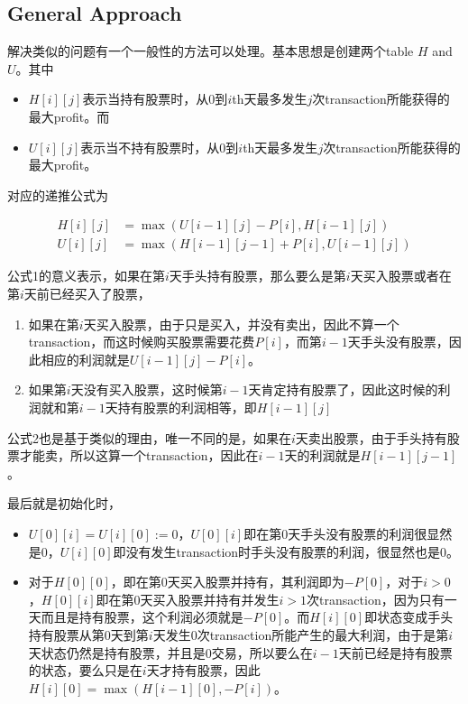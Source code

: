\subsection{General Approach}
\begin{CJK*}{UTF8}{gbsn}
解决类似的问题有一个一般性的方法可以处理。基本思想是创建两个table $H$ and $U$。其中
\begin{itemize}
\item $H[i][j]$表示当持有股票时，从0到$i$th天最多发生$j$次transaction所能获得的最大profit。而
\item $U[i][j]$表示当不持有股票时，从0到$i$th天最多发生$j$次transaction所能获得的最大profit。
\end{itemize}
对应的递推公式为
\end{CJK*}
\begin{align*}
H[i][j] &= \max(U[i-1][j]-P[i], H[i-1][j]) \\
U[i][j] &= \max(H[i-1][j-1] + P[i], U[i-1][j])
\end{align*}
\begin{CJK*}{UTF8}{gbsn}
公式1的意义表示，如果在第$i$天手头持有股票，那么要么是第$i$天买入股票或者在第$i$天前已经买入了股票，
\begin{enumerate}
\item 如果在第$i$天买入股票，由于只是买入，并没有卖出，因此不算一个transaction，而这时候购买股票需要花费$P[i]$，而第$i-1$天手头没有股票，因此相应的利润就是$U[i-1][j] - P[i]$。
\item 如果第$i$天没有买入股票，这时候第$i-1$天肯定持有股票了，因此这时候的利润就和第$i-1$天持有股票的利润相等，即$H[i-1][j]$
\end{enumerate}
公式2也是基于类似的理由，唯一不同的是，如果在$i$天卖出股票，由于手头持有股票才能卖，所以这算一个transaction，因此在$i-1$天的利润就是$H[i-1][j-1]$。
\end{CJK*}
\par
\begin{CJK*}{UTF8}{gbsn}
最后就是初始化时，
\begin{itemize}
\item $U[0][i]=U[i][0]:=0$，$U[0][i]$即在第0天手头没有股票的利润很显然是0，$U[i][0]$即没有发生transaction时手头没有股票的利润，很显然也是0。
\item 对于$H[0][0]$，即在第0天买入股票并持有，其利润即为$-P[0]$，对于$i>0$，$H[0][i]$即在第0天买入股票并持有并发生$i>1$次transaction，因为只有一天而且是持有股票，这个利润必须就是$-P[0]$。而$H[i][0]$即状态变成手头持有股票从第0天到第$i$天发生0次transaction所能产生的最大利润，由于是第$i$天状态仍然是持有股票，并且是0交易，所以要么在$i-1$天前已经是持有股票的状态，要么只是在$i$天才持有股票，因此$H[i][0]=\max(H[i-1][0], -P[i])$。
\end{itemize}
\end{CJK*}

